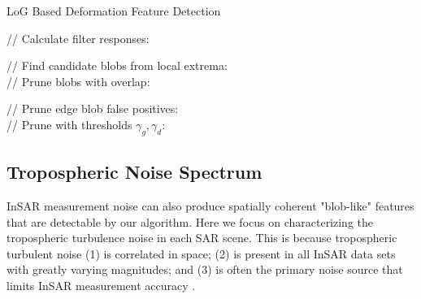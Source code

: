 \documentclass{utexasthesis}
\begin{document}
\begin{algorithm} [htb]
\caption{LoG Based Deformation Feature Detection}\label{algo:blobs}
\SetAlgoLined
{}


// Calculate filter responses:\\

// Find candidate blobs from local extrema:\\
\For{$ (i, j, m) \in  L $}{
	\If{$L[i, j, m] $ is local extremum }{
		Compute $ r = \sqrt{2}\sigma_m $ \\
		Add $ (i, j, r) $ to list of candidate detections
	}
}
// Prune blobs with overlap:\\

// Prune edge blob false positives:\\
// Prune with thresholds $ \gamma_g, \gamma_d $:\\
\end{algorithm}



\subsection{Tropospheric Noise Spectrum}
\label{subsec:methods-2-tropo-spectrum}
 InSAR measurement noise can also produce spatially coherent "blob-like" features that are detectable by our algorithm.  Here we focus on characterizing the tropospheric turbulence noise in each SAR scene. This is because tropospheric turbulent noise (1) is correlated in space; (2) is present in all InSAR data sets with greatly varying magnitudes; and (3) is often the primary noise source that limits InSAR measurement accuracy \citep{Bekaert2015StatisticalComparisonInsar}.
\end{document}
